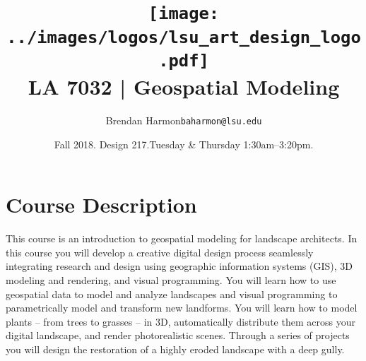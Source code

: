 \documentclass[11pt,article,oneside]{memoir}
\makeatletter
\def\myauthor{Author}
\def\mytitle{Title}
\def\myemail{baharmon@lsu.edu}
\def\myauthor{Brendan Harmon}
\def\mytitle{ \texttt{[image: ../images/logos/lsu\_art\_design\_logo.pdf]} \\[0.1cm] {\normalfont \normalsize LA 7032 |} \Large Geospatial Modeling} %
\newcommand{\globalcolor}[1]{%
  \color{#1}\global\let\default@color\current@color
}
\makeatother
\begin{document}
\setlength\bibitemsep{0.75em}

\setmainfont[Scale=1, Path = fonts/lato/,BoldItalicFont=Lato-RegIta,BoldFont=Lato-Reg,ItalicFont=Lato-LigIta]{Lato-Lig}
\setsansfont[Scale=1, Path = fonts/lato/,BoldItalicFont=Lato-RegIta,BoldFont=Lato-Reg,ItalicFont=Lato-LigIta]{Lato-Lig}
\setmonofont[Mapping=tex-text,Scale=0.8,Path = fonts/inconsolata/]{i}

\def\ind{\hangindent=1 true cm\hangafter=1 \noindent}
\def\labelitemi{$\cdot$}

\title{\LARGE \mytitle}
\author{\Large\myauthor \newline \footnotesize\texttt{\noindent\myemail}}
\date{Fall 2018. Design 217.\newline Tuesday \& Thursday 1:30am--3:20pm.}
\published{\,}


\globalcolor{black}
\vspace*{-10em}
\maketitle
\clearpage


\globalcolor{black}

\vspace*{-10em}
\maketitle

\section{Course Description}

This course is an introduction to 
geospatial modeling for landscape architects.
In this course you will develop a creative digital design process
seamlessly integrating research and design
using geographic information systems (GIS),
3D modeling and rendering, and
visual programming.
You will learn how to use geospatial data
to model and analyze landscapes
and visual programming to
parametrically model and transform new landforms.
You will learn how to model plants -- from trees to grasses -- in 3D,
automatically distribute them across your digital landscape,
and render photorealistic scenes.
Through a series of projects you will design the restoration 
of a highly eroded landscape with a deep gully.\\
\end{document}
